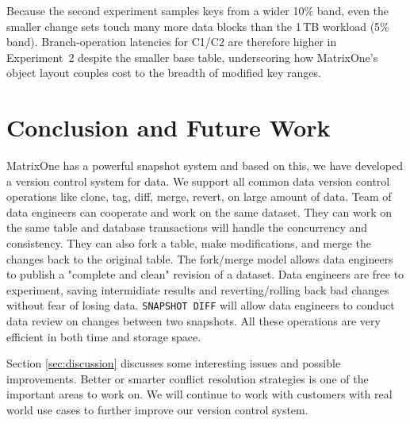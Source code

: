 \documentclass[sigconf,nonacm]{acmart} %
\begin{document}
Because the second experiment samples keys from a wider 10\% band, even
the smaller change sets touch many more data blocks than the 1\,TB
workload (5\% band).  Branch-operation latencies for C1/C2 are therefore
higher in Experiment~2 despite the smaller base table, underscoring how
MatrixOne's object layout couples cost to the breadth of modified key
ranges.

\section{Conclusion and Future Work}
MatrixOne has a powerful snapshot system and based on this, we have 
developed a version control system for data.  We support all common
data version control operations like clone, tag, diff, merge, 
revert, on large amount of data.  Team of data engineers can cooperate 
and work on the same dataset.  They can work on the same table and
database transactions will handle the concurrency and consistency.
They can also fork a table, make modifications, and merge the changes 
back to the original table.   The fork/merge model allows data
engineers to publish a "complete and clean" revision of a dataset.
Data engineers are free to experiment, saving intermidiate results
and reverting/rolling back bad changes without fear of losing data.
\texttt{SNAPSHOT DIFF} will allow data engineers to conduct 
data review on changes between two snapshots.  All these operations
are very efficient in both time and storage space.

Section \ref{sec:discussion} discusses some interesting issues 
and possible improvements.  Better or smarter conflict 
resolution strategies is one of the important areas to work on.
We will continue to work with customers with real world use 
cases to further improve our version control system.  
\end{document}
